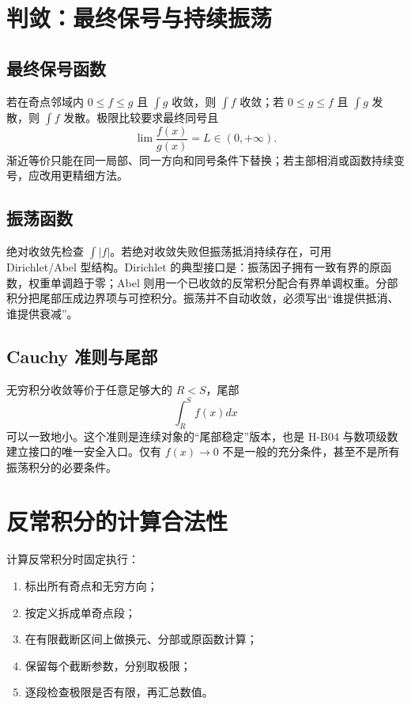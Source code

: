 \documentclass[11pt,a4paper,fontset=fandol]{ctexart}
\begin{document}
\section{判敛：最终保号与持续振荡}

\subsection{最终保号函数}

若在奇点邻域内 $0\le f\le g$ 且 $\int g$ 收敛，则 $\int f$ 收敛；若 $0\le g\le f$ 且 $\int g$ 发散，则 $\int f$ 发散。极限比较要求最终同号且
\[
\lim\frac{f(x)}{g(x)}=L\in(0,+\infty).
\]
渐近等价只能在同一局部、同一方向和同号条件下替换；若主部相消或函数持续变号，应改用更精细方法。

\subsection{振荡函数}

绝对收敛先检查 $\int\lvert f\rvert$。若绝对收敛失败但振荡抵消持续存在，可用 Dirichlet/Abel 型结构。Dirichlet 的典型接口是：振荡因子拥有一致有界的原函数，权重单调趋于零；Abel 则用一个已收敛的反常积分配合有界单调权重。分部积分把尾部压成边界项与可控积分。振荡并不自动收敛，必须写出“谁提供抵消、谁提供衰减”。

\subsection{Cauchy 准则与尾部}

无穷积分收敛等价于任意足够大的 $R<S$，尾部
\[
\int_R^S{f(x)}dx
\]
可以一致地小。这个准则是连续对象的“尾部稳定”版本，也是 H-B04 与数项级数建立接口的唯一安全入口。仅有 $f(x)\to0$ 不是一般的充分条件，甚至不是所有振荡积分的必要条件。

\section{反常积分的计算合法性}

计算反常积分时固定执行：
\begin{enumerate}
  \item 标出所有奇点和无穷方向；
  \item 按定义拆成单奇点段；
  \item 在有限截断区间上做换元、分部或原函数计算；
  \item 保留每个截断参数，分别取极限；
  \item 逐段检查极限是否有限，再汇总数值。
\end{enumerate}
\end{document}
